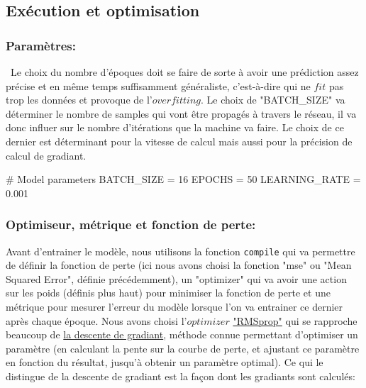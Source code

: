 \documentclass[a4paper,oneside,11pt]{article}
\begin{document}
\subsection*{Exécution et optimisation}
%
\subsubsection*{Paramètres:} 
%
\ Le choix du nombre d'époques doit se faire de sorte à avoir une prédiction assez précise et en même temps suffisamment généraliste, c'est-à-dire qui ne $fit$ pas trop les données et provoque de l'$overfitting$. \newline
Le choix de "BATCH\_SIZE" va déterminer le nombre de samples qui vont être propagés à travers le réseau, il va donc influer sur le nombre d'itérations que la machine va faire. Le choix de ce dernier est déterminant pour la vitesse de calcul mais aussi pour la précision de calcul de gradiant.
\begin{code-Python}
# Model parameters
BATCH_SIZE = 16
EPOCHS = 50
LEARNING_RATE = 0.001
\end{code-Python}

\subsubsection*{Optimiseur, métrique et fonction de perte:}
%
\qquad Avant d'entrainer le modèle, nous utilisons la fonction \verb+compile+ qui va permettre de définir la fonction de perte (ici nous avons choisi la fonction "mse" ou "Mean Squared Error", définie précédemment), un "optimizer" qui va avoir une action sur les poids (définis plus haut) pour minimiser la fonction de perte et une métrique pour mesurer l'erreur du modèle lorsque l'on va entrainer ce dernier après chaque époque. \newline
\qquad Nous avons choisi l'$optimizer$ \underline{"RMSprop"} qui se rapproche beaucoup de \underline{la descente de gradiant}, méthode connue permettant d'optimiser un paramètre (en calculant la pente sur la courbe de perte, et ajustant ce paramètre en fonction du résultat, jusqu'à obtenir un paramètre optimal). \newline
Ce qui le distingue de la descente de gradiant est la façon dont les gradiants sont calculés:
\end{document}
